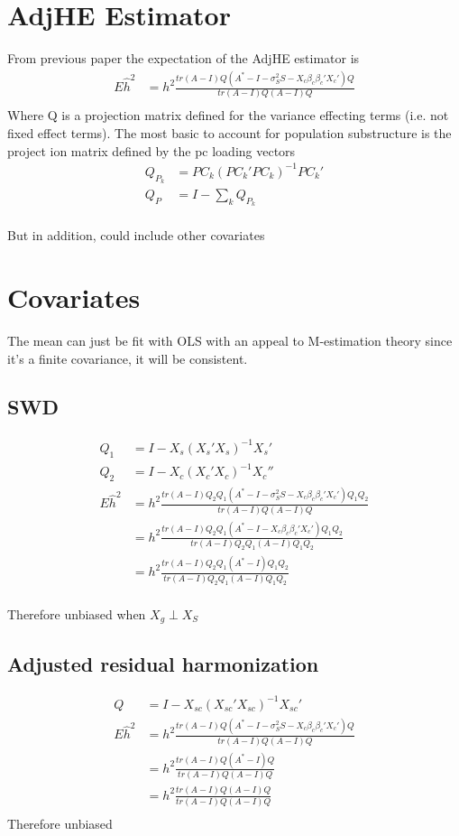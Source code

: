 \documentclass{article}
\begin{document}
\section{AdjHE Estimator}
From previous paper the expectation of the AdjHE estimator is 
\begin{align*}
	E\hat h^2 & = h^2 \frac{tr(A  -I)Q(A^* - I - \sigma_S^2 S- X_c\beta_c\beta_c'X_c')Q}{tr(A -  I)Q(A - I) Q} \\
\end{align*}
Where Q is a projection matrix defined for the variance effecting terms (i.e. not fixed effect terms). The most basic to account for population substructure is the project ion matrix defined by the pc loading vectors 
\begin{align*}
	Q_{P_k} & = PC_k(PC_k'PC_k)^{-1}PC_k' \\
	Q_P & = I -  \sum_k Q_{P_k} \\
\end{align*}

But in addition, could include other covariates

\section{Covariates}
The mean can just be fit with OLS with an appeal to M-estimation theory since it's a finite covariance, it will be consistent.

\subsection{SWD}

\begin{align*}
	Q_1 & = I - X_s(X_s'X_s)^{-1}X_s' \\
	Q_2 & = I - X_c(X_c'X_c)^{-1}X_c'' \\
	E\hat h^2 & = h^2 \frac{tr(A  -I)Q_2Q_1(A^* - I - \sigma_S^2 S- X_c\beta_c\beta_c'X_c')Q_1Q_2}{tr(A -  I)Q(A - I) Q} \\
	& = h^2 \frac{tr(A  -I)Q_2Q_1(A^* - I- X_c\beta_c\beta_c'X_c')Q_1Q_2}{tr(A -  I)Q_2Q_1(A - I) Q_1Q_2} \\
	& = h^2 \frac{tr(A  -I)Q_2Q_1(A^* - I)Q_1Q_2}{tr(A -  I)Q_2Q_1(A - I) Q_1Q_2} \tag{$X_c \perp X_s$}\\
\end{align*}

Therefore unbiased when $X_g\perp X_S$ 


\subsection{Adjusted residual harmonization}
\begin{align*}
	Q & = I -  X_{sc}(X_{sc}'X_{sc})^{-1}X_{sc}' \\
	E\hat h^2 & = h^2 \frac{tr(A  -I)Q(A^* - I - \sigma_S^2 S- X_c\beta_c\beta_c'X_c')Q}{tr(A -  I)Q(A - I) Q} \\
	& = h^2 \frac{tr(A  -I)Q(A^* - I)Q}{tr(A -  I)Q(A - I) Q} \\
	& = h^2 \frac{tr(A  -I)Q(A - I)Q}{tr(A -  I)Q(A - I) Q} \\
\end{align*}
Therefore unbiased
\end{document}

